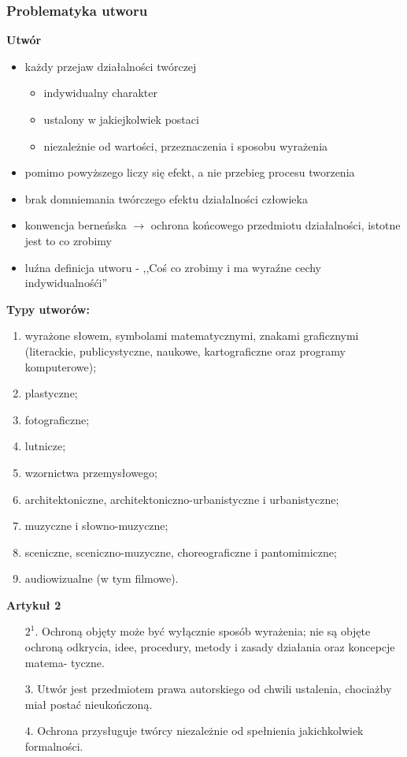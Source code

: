 \documentclass[12pt,a4paper]{article}
\begin{document}
\subsubsection{Problematyka utworu}
\textbf{Utwór}
\begin{itemize}
\item każdy przejaw działalności twórczej
	\begin{itemize}
	\item indywidualny charakter
	\item ustalony w jakiejkolwiek postaci
	\item niezależnie od wartości, przeznaczenia i sposobu wyrażenia
	\end{itemize}
\item pomimo powyższego liczy się efekt, a nie przebieg procesu tworzenia
\item brak domniemania twórczego efektu działalności człowieka
\item konwencja berneńska $\rightarrow$ ochrona końcowego przedmiotu działalności, istotne jest to co zrobimy	
\item luźna definicja utworu - ,,Coś co zrobimy i ma wyraźne cechy indywidualnośći''
\end{itemize}
\noindent
\textbf{Typy utworów:}
\begin{enumerate}
\item wyrażone słowem,  symbolami  matematycznymi,  znakami graficznymi (literackie,  publicystyczne,  naukowe,  kartograficzne  oraz  programy  komputerowe); 
\item plastyczne; 
\item fotograficzne; 
\item lutnicze; 
\item wzornictwa przemysłowego; 
\item architektoniczne, architektoniczno-urbanistyczne i urbanistyczne; 
\item muzyczne i słowno-muzyczne; 
\item sceniczne, sceniczno-muzyczne, choreograficzne i pantomimiczne; 
\item audiowizualne (w tym filmowe). 
\end{enumerate}
\noindent
\textbf{Artykuł 2}
\begin{enumerate}
\item[$2^1$.] Ochroną  objęty  może  być  wyłącznie  sposób  wyrażenia;  nie  są  objęte  ochroną odkrycia,  idee,  procedury,  metody  i  zasady  działania  oraz  koncepcje  matema- tyczne. 
\item[$3$.] Utwór jest przedmiotem prawa autorskiego od chwili ustalenia, chociażby miał postać nieukończoną. 
\item[$4$.] Ochrona przysługuje twórcy niezależnie od spełnienia jakichkolwiek formalności. 
\end{enumerate}
\end{document}
